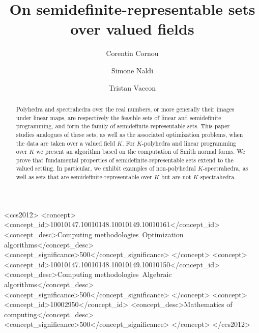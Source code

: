 \documentclass[sigconf]{acmart}
\providecommand{\DIFaddbegin}{} %
\providecommand{\DIFaddend}{} %
\newcommand{\DIFaddincludegraphics}[2][]{{\color{blue}\fbox{\DIFOincludegraphics[#1]{#2}}}} %
\DeclareRobustCommand{\DIFaddbegin}{\DIFOaddbegin \let\includegraphics\DIFaddincludegraphics} %
\DeclareRobustCommand{\DIFaddend}{\DIFOaddend \let\includegraphics\DIFOincludegraphics} %
\begin{document}
\title{On semidefinite-representable sets over valued fields}

\author{Corentin Cornou}
\DIFaddbegin {}
\DIFaddend {}

\author{Simone Naldi}
\DIFaddbegin {}
\DIFaddend {}

\author{Tristan Vaccon}
\DIFaddbegin {}
\DIFaddend {}


\renewcommand{\shortauthors}{C. Cornou, S. Naldi and T. Vaccon}

\begin{abstract}
  Polyhedra and spectrahedra over the real numbers, or more generally
  their images under linear maps, are respectively the feasible sets
  of linear and semidefinite
  programming, and form the family of semidefinite-representable sets.
  This paper studies analogues of these sets, as well as
  the associated optimization problems, when the data are taken over a valued 
  field $K$.
  For $K$-polyhedra and linear programming over $K$ we present an algorithm
  based on the computation of Smith normal forms.
  We prove that fundamental properties of semidefinite-representable sets extend
  to the valued setting.
  In particular, we exhibit examples of non-polyhedral $K$-spectrahedra, as well as
 sets that are semidefinite-representable over $K$ but are not $K$-spectrahedra.
\end{abstract}

\begin{CCSXML}
<ccs2012>
<concept>
<concept_id>10010147.10010148.10010149.10010161</concept_id>
<concept_desc>Computing methodologies~Optimization algorithms</concept_desc>
<concept_significance>500</concept_significance>
</concept>
<concept>
<concept_id>10010147.10010148.10010149.10010150</concept_id>
<concept_desc>Computing methodologies~Algebraic algorithms</concept_desc>
<concept_significance>500</concept_significance>
</concept>
<concept>
<concept_id>10002950</concept_id>
<concept_desc>Mathematics of computing</concept_desc>
<concept_significance>500</concept_significance>
</concept>
</ccs2012>
\end{CCSXML}
\end{document}
